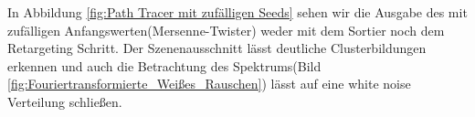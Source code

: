 In Abbildung \ref{fig:Path Tracer mit zufälligen Seeds} sehen wir die Ausgabe des 
mit zufälligen Anfangswerten(Mersenne-Twister) weder mit dem Sortier noch dem 
Retargeting Schritt. Der Szenenausschnitt lässt deutliche Clusterbildungen erkennen und auch
die Betrachtung des Spektrums(Bild \ref{fig:Fouriertransformierte_Weißes_Rauschen}) lässt auf eine 
white noise Verteilung schließen.
